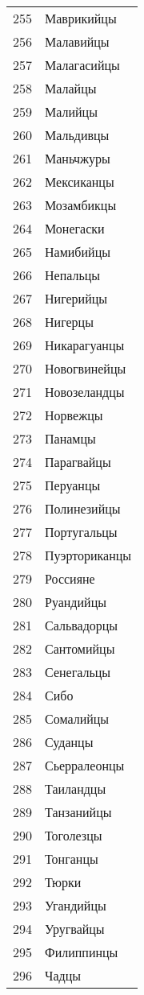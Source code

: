 \documentclass[10pt, a4paper, titlepage]{article}
\begin{document}
\begin{xtabular}{rp{.38\textwidth}}
    255 & Маврикийцы \\
    256 & Малавийцы \\
    257 & Малагасийцы \\
    258 & Малайцы \\
    259 & Малийцы \\
    260 & Мальдивцы \\
    261 & Маньчжуры \\
    262 & Мексиканцы \\
    263 & Мозамбикцы \\
    264 & Монегаски \\
    265 & Намибийцы \\
    266 & Непальцы \\
    267 & Нигерийцы \\
    268 & Нигерцы \\
    269 & Никарагуанцы \\
    270 & Новогвинейцы \\
    271 & Новозеландцы \\
    272 & Норвежцы \\
    273 & Панамцы \\
    274 & Парагвайцы \\
    275 & Перуанцы \\
    276 & Полинезийцы \\
    277 & Португальцы \\
    278 & Пуэрториканцы \\
    279 & Россияне \\
    280 & Руандийцы \\
    281 & Сальвадорцы \\
    282 & Сантомийцы \\
    283 & Сенегальцы \\
    284 & Сибо \\
    285 & Сомалийцы \\
    286 & Суданцы \\
    287 & Сьерралеонцы \\
    288 & Таиландцы \\
    289 & Танзанийцы \\
    290 & Тоголезцы \\
    291 & Тонганцы \\
    292 & Тюрки \\
    293 & Угандийцы \\
    294 & Уругвайцы \\
    295 & Филиппинцы \\
    296 & Чадцы \\

\end{xtabular}
\end{document}
